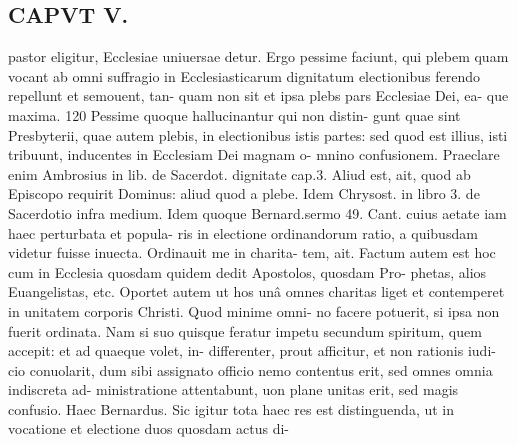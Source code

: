 \documentclass{article}
\begin{document}
\begin{pages}
\section*{CAPVT V. }
\marginpar{[ p.349 ]}pastor eligitur, Ecclesiae uniuersae detur. Ergo pessime faciunt, qui plebem quam vocant ab omni suffragio in Ecclesiasticarum dignitatum electionibus ferendo repellunt et semouent, tan- quam non sit et ipsa plebs pars Ecclesiae Dei, ea- que maxima. 120 Pessime quoque hallucinantur qui non distin- gunt quae sint Presbyterii, quae autem plebis, in electionibus istis partes: sed quod est illius, isti tribuunt, inducentes in Ecclesiam Dei magnam o- mnino confusionem. Praeclare enim Ambrosius in lib. de Sacerdot. dignitate cap.3. Aliud est, ait, quod ab Episcopo requirit Dominus: aliud quod a plebe. Idem Chrysost. in libro 3. de Sacerdotio infra medium. Idem quoque Bernard.sermo 49. Cant. cuius aetate iam haec perturbata et popula- ris in electione ordinandorum ratio, a quibusdam videtur fuisse inuecta. Ordinauit me in charita- tem, ait. Factum autem est hoc cum in Ecclesia quosdam quidem dedit Apostolos, quosdam Pro- phetas, alios Euangelistas, etc. Oportet autem ut hos unâ omnes charitas liget et contemperet in unitatem corporis Christi. Quod minime omni- no facere potuerit, si ipsa non fuerit ordinata. Nam si suo quisque feratur impetu secundum spiritum, quem accepit: et ad quaeque volet, in- differenter, prout afficitur, et non rationis iudi- cio conuolarit, dum sibi assignato officio nemo contentus erit, sed omnes omnia indiscreta ad- ministratione attentabunt, uon plane unitas erit, sed magis confusio. Haec Bernardus. Sic igitur tota haec res est distinguenda, ut in vocatione et electione duos quosdam actus di- 

\end{pages}
\end{document}
